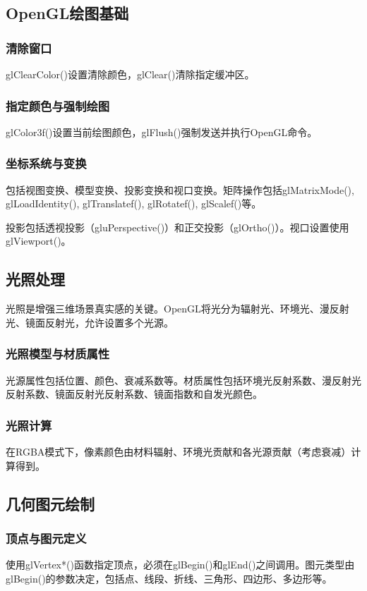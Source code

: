 \documentclass[12pt]{article}
\begin{document}
\subsection{OpenGL绘图基础}

\subsubsection{清除窗口}
glClearColor()设置清除颜色，glClear()清除指定缓冲区。

\subsubsection{指定颜色与强制绘图}
glColor3f()设置当前绘图颜色，glFlush()强制发送并执行OpenGL命令。

\subsubsection{坐标系统与变换}
包括视图变换、模型变换、投影变换和视口变换。矩阵操作包括glMatrixMode(), glLoadIdentity(), glTranslatef(), glRotatef(), glScalef()等。

投影包括透视投影（gluPerspective()）和正交投影（glOrtho()）。视口设置使用glViewport()。

\subsection{光照处理}

光照是增强三维场景真实感的关键。OpenGL将光分为辐射光、环境光、漫反射光、镜面反射光，允许设置多个光源。

\subsubsection{光照模型与材质属性}
光源属性包括位置、颜色、衰减系数等。材质属性包括环境光反射系数、漫反射光反射系数、镜面反射光反射系数、镜面指数和自发光颜色。

\subsubsection{光照计算}
在RGBA模式下，像素颜色由材料辐射、环境光贡献和各光源贡献（考虑衰减）计算得到。

\subsection{几何图元绘制}

\subsubsection{顶点与图元定义}
使用glVertex*()函数指定顶点，必须在glBegin()和glEnd()之间调用。图元类型由glBegin()的参数决定，包括点、线段、折线、三角形、四边形、多边形等。
\end{document}
